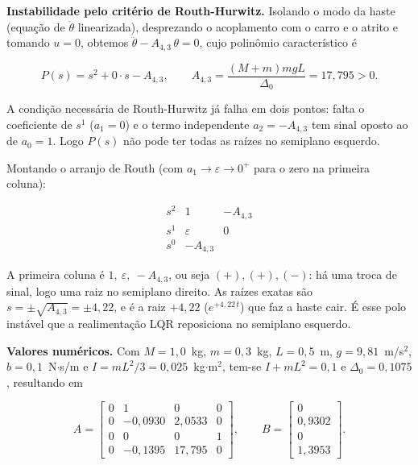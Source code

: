 \documentclass[brazil, 12pt]{article}
\begin{document}
\medskip

\noindent\textbf{Instabilidade pelo critério de Routh-Hurwitz.}
Isolando o modo da haste (equação de $\ddot{\theta}$ linearizada), desprezando o
acoplamento com o carro e o atrito e tomando $u=0$, obtemos
$\ddot{\theta} - A_{4,3}\,\theta = 0$, cujo polinômio característico é

\[
P(s) = s^{2} + 0\cdot s - A_{4,3},
\qquad A_{4,3} = \frac{(M+m)mgL}{\Delta_0} = 17{,}795 > 0.
\]

A condição necessária de Routh-Hurwitz já falha em dois pontos: falta o
coeficiente de $s^{1}$ ($a_1=0$) e o termo independente $a_2=-A_{4,3}$ tem sinal
oposto ao de $a_0=1$. Logo $P(s)$ não pode ter todas as raízes no semiplano
esquerdo.

Montando o arranjo de Routh (com $a_1\to\varepsilon\to0^+$ para o zero na
primeira coluna):

\[
\begin{array}{c|cc}
s^{2} & 1 & -A_{4,3} \\[2pt]
s^{1} & \varepsilon & 0 \\[2pt]
s^{0} & -A_{4,3} &
\end{array}
\]

A primeira coluna é $1,\ \varepsilon,\ -A_{4,3}$, ou seja $(+),(+),(-)$: há uma
troca de sinal, logo uma raiz no semiplano direito. As raízes exatas são
$s=\pm\sqrt{A_{4,3}}=\pm4{,}22$, e é a raiz $+4{,}22$ ($e^{+4{,}22\,t}$) que faz
a haste cair. É esse polo instável que a realimentação LQR reposiciona no
semiplano esquerdo.

\medskip

\noindent\textbf{Valores numéricos.} Com
$M=1{,}0$~kg, $m=0{,}3$~kg, $L=0{,}5$~m, $g=9{,}81$~m/s$^2$, $b=0{,}1$~N$\cdot$s/m
e $I=mL^{2}/3=0{,}025$~kg$\cdot$m$^2$, tem-se $I+mL^{2}=0{,}1$ e
$\Delta_0 = 0{,}1075$, resultando em

\[
A =
\begin{bmatrix}
0 & 1 & 0 & 0 \\
0 & -0{,}0930 & 2{,}0533 & 0 \\
0 & 0 & 0 & 1 \\
0 & -0{,}1395 & 17{,}795 & 0
\end{bmatrix},
\qquad
B =
\begin{bmatrix}
0 \\ 0{,}9302 \\ 0 \\ 1{,}3953
\end{bmatrix}.
\]

\end{document}
